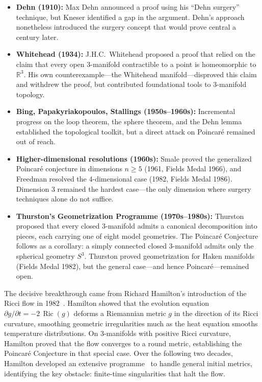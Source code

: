 \documentclass[11pt]{article}
\DeclareMathOperator{\Ric}{Ric}
\begin{document}
\begin{itemize}
\item \textbf{Dehn (1910):} Max Dehn announced a proof using his
``Dehn surgery'' technique, but Kneser identified a gap in the
argument.  Dehn's approach nonetheless introduced the surgery concept
that would prove central a century later.

\item \textbf{Whitehead (1934):} J.H.C.\ Whitehead proposed a proof
that relied on the claim that every open 3-manifold contractible to a
point is homeomorphic to $\mathbb{R}^3$.  His own counterexample---the
Whitehead manifold---disproved this claim and withdrew the proof, but
contributed foundational tools to 3-manifold topology.

\item \textbf{Bing, Papakyriakopoulos, Stallings (1950s--1960s):}
Incremental progress on the loop theorem, the sphere theorem, and
the Dehn lemma established the topological toolkit, but a direct
attack on Poincar\'e remained out of reach.

\item \textbf{Higher-dimensional resolutions (1960s):} Smale
proved the generalized Poincar\'e conjecture in dimensions $n \geq 5$
(1961, Fields Medal 1966), and Freedman resolved the 4-dimensional
case (1982, Fields Medal 1986).  Dimension 3 remained the hardest
case---the only dimension where surgery techniques alone do not suffice.

\item \textbf{Thurston's Geometrization Programme (1970s--1980s):}
Thurston~\cite{Thurston} proposed that every closed 3-manifold admits a
canonical decomposition into pieces, each carrying one of eight model
geometries.  The Poincar\'e Conjecture follows as a corollary: a simply
connected closed 3-manifold admits only the spherical geometry $S^3$.
Thurston proved geometrization for Haken manifolds (Fields Medal 1982),
but the general case---and hence Poincar\'e---remained open.
\end{itemize}

\noindent
The decisive breakthrough came from Richard Hamilton's introduction of
the Ricci flow in 1982~\cite{Ham82}.  Hamilton showed that the
evolution equation $\partial g / \partial t = -2\,\Ric(g)$ deforms a
Riemannian metric $g$ in the direction of its Ricci curvature, smoothing
geometric irregularities much as the heat equation smooths temperature
distributions.  On 3-manifolds with positive Ricci curvature, Hamilton
proved that the flow converges to a round metric, establishing the
Poincar\'e Conjecture in that special case.  Over the following two
decades, Hamilton developed an extensive programme~\cite{Ham86,Ham95}
to handle general initial metrics, identifying the key obstacle:
finite-time singularities that halt the flow.
\end{document}
